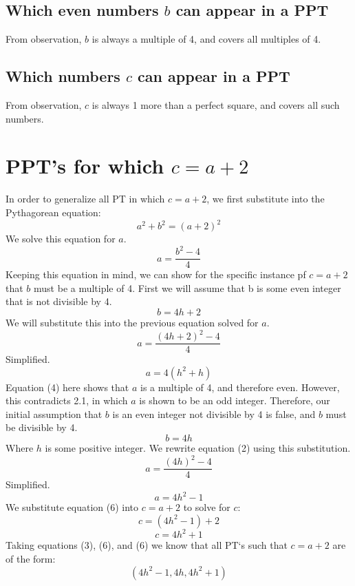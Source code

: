 \documentclass[12pt]{article}
\begin{document}
\subsection{Which even numbers $b$ can appear in a PPT}
From observation, $b$ is always a multiple of 4, and covers all multiples of 4.

\subsection{Which numbers $c$ can appear in a PPT}
From observation, $c$ is always 1 more than a perfect square, and covers all such numbers.

\section{PPT's for which $c=a+2$}
In order to generalize all PT in which $c=a+2$, we first substitute into the Pythagorean equation:
\[
    a^2+b^2=(a+2)^2
\]
We solve this equation for $a$.
\begin{equation}
a = \frac{b^2 - 4}{4}
\end{equation}
Keeping this equation in mind, we can show for the specific instance pf $c=a+2$ that $b$ must be a multiple of 4. First we will assume that b is some even integer that is not divisible by 4.
\begin{equation}
    b=4h+2
\end{equation}
We will substitute this into the previous equation solved for $a$.
\[
    a=\frac{(4h+2)^2-4}{4}
\]
Simplified.
\begin{equation}
    a=4(h^2+h)
\end{equation}
Equation (4) here shows that $a$ is a multiple of 4, and therefore even. However, this contradicts 2.1, in which $a$ is shown to be an odd integer. Therefore, our initial assumption that $b$ is an even integer not divisible by 4 is false, and $b$ must be divisible by 4.
\begin{equation}
    b=4h
\end{equation}
Where $h$ is some positive integer. We rewrite equation (2) using this substitution.
\[
    a = \frac{(4h)^2 - 4}{4}
\]
Simplified.
\begin{equation}
a = 4h^2 - 1
\end{equation}
We substitute equation (6) into $c=a+2$ to solve for $c$:
\[
c=(4h^2 - 1) +2
\]
\begin{equation}
    c=4h^2+1
\end{equation}
Taking equations (3), (6), and (6) we know that all PT‘s such that $c=a+2$ are of the form:
\[
(4h^2-1, 4h, 4h^2+1)
\]
\end{document}
